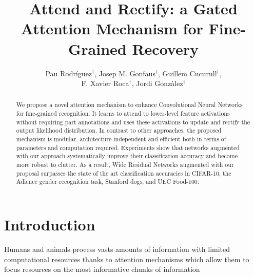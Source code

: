 \documentclass[runningheads]{llncs}
\begin{document}
\pagestyle{headings}
\mainmatter
\def\ECCV18SubNumber{2126}  

\title{Attend and Rectify: a Gated Attention Mechanism for Fine-Grained Recovery} 



\author{Pau Rodr\'{i}guez$^\dagger$, Josep M. Gonfaus$^\ddagger$, Guillem Cucurull$^\dagger$, \\ F. Xavier Roca$^{\dagger}$, Jordi Gonz\`{a}lez$^{\dagger}$}



\maketitle

\begin{abstract}
We propose a novel attention mechanism to enhance Convolutional
Neural Networks for fine-grained recognition. It learns to attend to lower-level feature activations without requiring part annotations and uses these activations to update and rectify the output likelihood distribution. In contrast to other approaches, the proposed mechanism is modular, architecture-independent and efficient both in terms of parameters and computation required. Experiments show that networks augmented with our approach systematically improve their classification accuracy and become more robust to clutter. As a result, Wide Residual Networks augmented with our proposal surpasses the state of the art classification accuracies in CIFAR-10, the Adience gender recognition task, Stanford dogs, and UEC Food-100.

\end{abstract}


\section{Introduction}
Humans and animals process vasts amounts of information with limited computational resources thanks to attention mechanisms which allow them to focus resources on the most informative chunks of information \cite{anderson1985cognitive,desimone1995neural,ungerleider2000mechanisms} 
\end{document}
